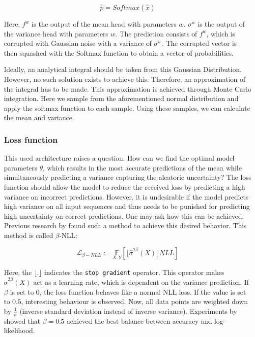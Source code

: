 \begin{equation}
    \hat{p} = Softmax(\hat{x})
\end{equation}

Here, $f^w$ is the output of the mean head with parameters $w$. $\sigma^w$ is the output of the variance head with parameters $w$. The prediction consists of $f^w$, which is corrupted with Gaussian noise with a variance of $\sigma^w$. The corrupted vector is then squashed with the Softmax function to obtain a vector of probabilities.

Ideally, an analytical integral should be taken from this Gaussian Distribution. However, no such solution exists to achieve this. Therefore, an approximation of the integral has to be made. This approximation is achieved through Monte Carlo integration. Here we sample from the aforementioned normal distribution and apply the softmax function to each sample. Using these samples, we can calculate the mean and variance.


\subsubsection{Loss function}

This used architecture raises a question. How can we find the optimal model parameters $\theta$, which results in the most accurate predictions of the mean while simultaneously predicting a variance capturing the aleatoric uncertainty? The loss function should allow the model to reduce the received loss by predicting a high variance on incorrect predictions. However, it is undesirable if the model predicts high variance on all input sequences and thus needs to be punished for predicting high uncertainty on correct predictions. One may ask how this can be achieved. Previous research by \cite{seitzer2022pitfalls} found such a method to achieve this desired behavior. This method is called $\beta$-NLL:

\begin{equation}
    \mathcal{L}_{\beta-NLL} := \underset{X, Y}{\mathbb{E}} \left[ \lfloor \hat{\sigma}^{2\beta}(X) \rfloor NLL \right]
\end{equation}

Here, the $\lfloor. \rfloor$ indicates the \verb|stop gradient| operator. This operator makes $\hat{\sigma}^{2\beta}(X)$ act as a learning rate, which is dependent on the variance prediction. If $\beta$ is set to 0, the loss function behaves like a normal NLL loss. If the value is set to $0.5$, interesting behaviour is observed. Now, all data points are weighted down by $\frac{1}{\sigma}$ (inverse standard deviation instead of inverse variance). Experiments by \cite{seitzer2022pitfalls} showed that $\beta = 0.5$ achieved the best balance between accuracy and log-likelihood.

